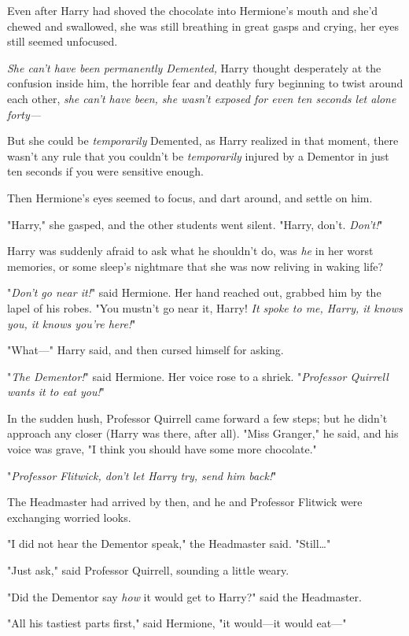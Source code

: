 Even after Harry had shoved the chocolate into Hermione's mouth and she'd 
chewed and swallowed, she was still breathing in great gasps and crying, her 
eyes still seemed unfocused.

\emph{She can't have been permanently Demented,} Harry thought desperately at 
the confusion inside him, the horrible fear and deathly fury beginning to twist 
around each other, \emph{she can't have been, she wasn't exposed for even ten 
seconds let alone forty---}

But she could be \emph{temporarily} Demented, as Harry realized in that moment, 
there wasn't any rule that you couldn't be \emph{temporarily} injured by a 
Dementor in just ten seconds if you were sensitive enough.

Then Hermione's eyes seemed to focus, and dart around, and settle on him.

"Harry," she gasped, and the other students went silent. "Harry, don't. 
\emph{Don't!}"

Harry was suddenly afraid to ask what he shouldn't do, was \emph{he} in her 
worst memories, or some sleep's nightmare that she was now reliving in waking 
life?

"\emph{Don't go near it!}" said Hermione. Her hand reached out, grabbed him by 
the lapel of his robes. "You mustn't go near it, Harry! \emph{It spoke to me, 
Harry, it knows you, it knows you're here!}"

"What---" Harry said, and then cursed himself for asking.

"\emph{The Dementor!}" said Hermione. Her voice rose to a shriek. 
"\emph{Professor Quirrell wants it to eat you!}"

In the sudden hush, Professor Quirrell came forward a few steps; but he didn't 
approach any closer (Harry was there, after all). "Miss Granger," he said, and 
his voice was grave, "I think you should have some more chocolate."

"\emph{Professor Flitwick, don't let Harry try, send him back!}"

The Headmaster had arrived by then, and he and Professor Flitwick were 
exchanging worried looks.

"I did not hear the Dementor speak," the Headmaster said. "Still{\ldots}"

"Just ask," said Professor Quirrell, sounding a little weary.

"Did the Dementor say \emph{how} it would get to Harry?" said the Headmaster.

"All his tastiest parts first," said Hermione, "it would---it would eat---"

